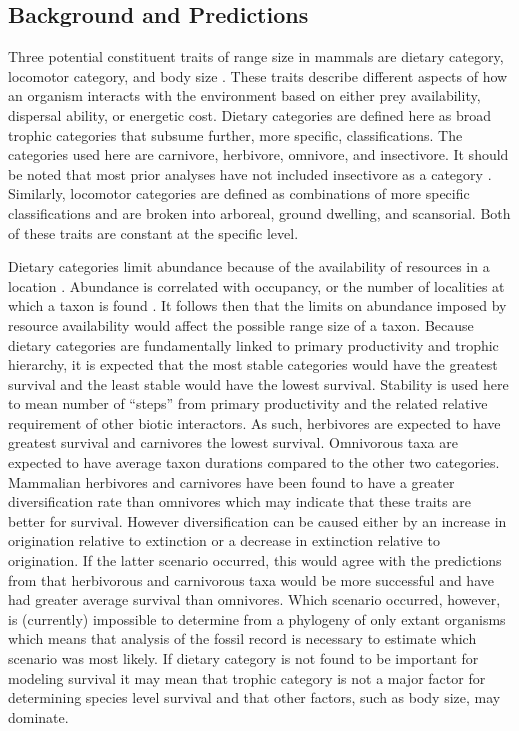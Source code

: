 \documentclass[12pt,letterpaper]{article}
\begin{document}
\subsection{Background and Predictions} \label{sec:mamsurvback}
Three potential constituent traits of range size in mammals are dietary category, locomotor category, and body size \citep{Smith2004,Smith2008b,Damuth1981a,Damuth1979,Jernvall2004,Lyons2005,Lyons2010}. These traits describe different aspects of how an organism interacts with the environment based on either prey availability, dispersal ability, or energetic cost. Dietary categories are defined here as broad trophic categories that subsume further, more specific, classifications. The categories used here are carnivore, herbivore, omnivore, and insectivore. It should be noted that most prior analyses have not included insectivore as a category \citep{Jernvall2004,Price2012}. Similarly, locomotor categories are defined as combinations of more specific classifications and are broken into arboreal, ground dwelling, and scansorial. Both of these traits are constant at the specific level. 

Dietary categories limit abundance because of the availability of resources in a location \citep{VanValen1989,Brown1987,Damuth1979,Silva1997,Janis2000}. Abundance is correlated with occupancy, or the number of localities at which a taxon is found \citep{Jernvall2002,Fortelius2002,Brown1984}. It follows then that the limits on abundance imposed by resource availability would affect the possible range size of a taxon. Because dietary categories are fundamentally linked to primary productivity and trophic hierarchy, it is expected that the most stable categories would have the greatest survival and the least stable would have the lowest survival. Stability is used here to mean number of ``steps'' from primary productivity and the related relative requirement of other biotic interactors. As such, herbivores are expected to have greatest survival and carnivores the lowest survival. Omnivorous taxa are expected to have average taxon durations compared to the other two categories. Mammalian herbivores and carnivores have been found to have a greater diversification rate than omnivores \citep{Price2012} which may indicate that these traits are better for survival. However diversification can be caused either by an increase in origination relative to extinction or a decrease in extinction relative to origination. If the latter scenario occurred, this would agree with the predictions from \citet{Price2012} that herbivorous and carnivorous taxa would be more successful and have had greater average survival than omnivores. Which scenario occurred, however, is (currently) impossible to determine from a phylogeny of only extant organisms \citep{Rabosky2010a} which means that analysis of the fossil record is necessary to estimate which scenario was most likely. If dietary category is not found to be important for modeling survival it may mean that trophic category is not a major factor for determining species level survival and that other factors, such as body size, may dominate. 
\end{document}
